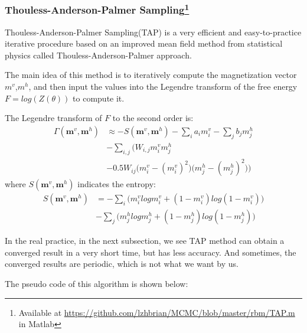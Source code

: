 
\subsubsection{Thouless-Anderson-Palmer Sampling\protect\footnote{Available at \protect\url{https://github.com/lzhbrian/MCMC/blob/master/rbm/TAP.m} in Matlab}}

Thouless-Anderson-Palmer Sampling(TAP)\cite{gabrie2015training} is a very efficient and easy-to-practice iterative procedure based on an improved mean field method from statistical physics called Thouless-Anderson-Palmer approach.

The main idea of this method is to iteratively compute the magnetization vector $m^{v}$,$m^{h}$, and then input the values into the Legendre transform of the free energy $F=log(Z(\theta))$ to compute it.

The Legendre transform of $F$ to the second order is:
\begin{equation}
\begin{split}
\Gamma(\mathbf m^{v},\mathbf m^{h}) &\approx - S(\mathbf m^{v},\mathbf m^{h}) - \sum_{i} a_{i}m^{v}_{i} - \sum_{j} b_{j}m^{h}_{j} \\
& - \sum_{i,j} \Bigg( W_{i,j}m^{v}_{i}m^{h}_{j} \\
& - 0.5W_{ij}\Big(m^{v}_{i}-(m^{v}_{i})^2\Big)\Big(m^{h}_{j}-(m^{h}_{j})^2\Big) \Bigg)
\end{split}
\end{equation}
where $S(\mathbf m^{v},\mathbf m^{h})$ indicates the entropy:
\begin{equation}
\begin{split}
S(\mathbf m^{v},\mathbf m^{h}) &= - \sum_{i} \Bigg(m^{v}_{i}logm^{v}_{i} + (1-m^{v}_{i})log(1-m^{v}_{i}) \Bigg) \\
&- \sum_{j} \Bigg(m^{h}_{j}logm^{h}_{j} + (1-m^{h}_{j})log(1-m^{h}_{j}) \Bigg)
\end{split}
\end{equation}

In the real practice, in the next subsection, we see TAP method can obtain a converged result in a very short time, but has less accuracy. And sometimes, the converged results are periodic, which is not what we want by us.

The pseudo code of this algorithm is shown below:

